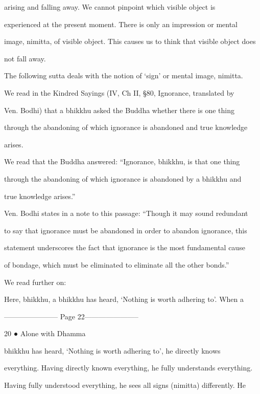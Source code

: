 arising   and   falling   away.   We   cannot   pinpoint   which   visible   object   is  

experienced  at  the  present  moment.  There  is  only  an  impression  or  mental  

image, nimitta, of visible object. This causes us to think that visible object does  

not fall away. 

   The following sutta deals with the notion of ‘sign’ or mental image, nimitta. 

   We  read  in  the  Kindred  Sayings  (IV,  Ch  II,  §80,  Ignorance,  translated by  

Ven.  Bodhi)  that   a  bhikkhu   asked  the   Buddha  whether   there  is  one  thing  

through the abandoning of which ignorance is abandoned and true knowledge  

arises. 

   We read that the Buddha answered: “Ignorance, bhikkhu, is that one thing  

through the  abandoning  of which  ignorance  is  abandoned by  a bhikkhu  and  

true knowledge arises.” 



Ven. Bodhi states in a note to this passage: “Though it may sound redundant  

to say that ignorance must be abandoned in order to abandon ignorance, this  

statement underscores the fact that ignorance is the most fundamental cause  

of bondage, which must be eliminated to eliminate all the other bonds.” 



We read further on: 



     Here, bhikkhu, a bhikkhu has heard, ‘Nothing is worth adhering to’. When a  


----------------------- Page 22-----------------------

20 ● Alone with Dhamma 



      bhikkhu has heard,  ‘Nothing is worth adhering to’, he directly knows  

      everything. Having directly known everything, he fully understands everything.  

      Having fully understood everything, he sees all signs (nimitta) differently. He  

